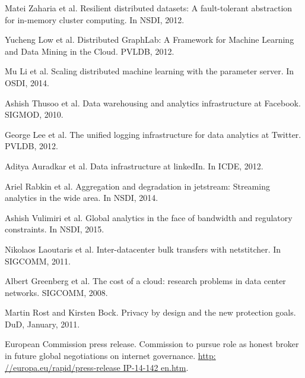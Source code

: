 \documentclass[10pt,conference,letterpaper]{IEEEtran}
\begin{document}
%
%
%
\begin{thebibliography}{1}

Matei Zaharia et al. Resilient distributed datasets: A fault-tolerant abstraction for in-memory cluster computing. In NSDI, 2012.


Yucheng Low et al. Distributed GraphLab: A Framework for Machine Learning and Data Mining in the Cloud. PVLDB, 2012.

Mu Li et al. Scaling distributed machine learning with the parameter server. In OSDI, 2014.

Ashish Thusoo et al. Data warehousing and analytics infrastructure at Facebook. SIGMOD, 2010.

George Lee et al. The unified logging infrastructure for data analytics at Twitter. PVLDB, 2012.

Aditya Auradkar et al. Data infrastructure at linkedIn. In ICDE, 2012.

Ariel Rabkin et al. Aggregation and degradation in jetstream: Streaming analytics in the wide area. In NSDI, 2014.

Ashish Vulimiri et al. Global analytics in the face of bandwidth and regulatory constraints. In NSDI, 2015.

Nikolaos Laoutaris et al. Inter-datacenter bulk transfers with netstitcher. In SIGCOMM, 2011.

Albert Greenberg et al. The cost of a cloud: research problems in data center networks. SIGCOMM, 2008.

Martin Rost and Kirsten Bock. Privacy by design and the new protection goals. DuD, January, 2011.

European Commission press release. Commission to pursue role as honest broker in future global negotiations on internet governance. \url{http: //europa.eu/rapid/press-release IP-14-142 en.htm}.


\end{thebibliography}
\end{document}

